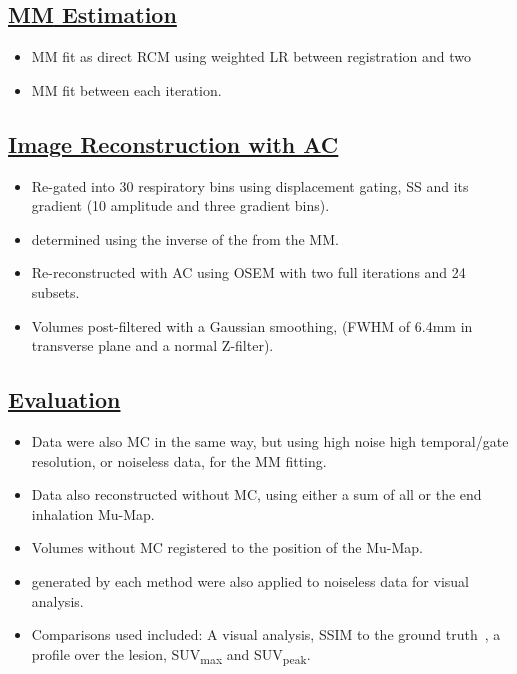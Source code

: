 \documentclass[portrait, color=UCLburgundy, margin=1cm]{uclposter}
\begin{document}
\begin{multicols}{3}
            \subsection*{\underline{\textbf{\acrlong{MM} Estimation}}}
                \begin{itemize}
                    \item \gls{MM} fit as direct \acrlong{RCM} using weighted \gls{LR} between registration  and two 
                    \item \gls{MM} fit between each iteration.
                \end{itemize}
            
            \subsection*{\underline{\textbf{Image Reconstruction with AC}}}
                \begin{itemize}
                    \item Re-gated into 30 respiratory bins using displacement gating, \gls{SS} and its gradient (10 amplitude and three gradient bins).
                    \item {} determined using the inverse of the  from the \gls{MM}.
                    \item Re-reconstructed with \gls{AC} using \gls{OSEM} with two full iterations and 24 subsets.
                    \item Volumes post-filtered with a Gaussian smoothing, (\gls{FWHM} of 6.4mm in transverse plane and a normal Z-filter).
                \end{itemize}
            
            \subsection*{\underline{\textbf{Evaluation}}}
                \begin{itemize}
                    \item Data were also \gls{MC} in the same way, but using high noise high temporal/gate resolution, or noiseless data, for the \gls{MM} fitting.
                    \item Data also reconstructed without \gls{MC}, using either a sum of all  or the end inhalation \gls{Mu-Map}.
                    \item Volumes without \gls{MC} registered to the position of the \gls{Mu-Map}.
                    \item {} generated by each method were also applied to noiseless data for visual analysis.
                    \item Comparisons used included: A visual analysis, \acrshort{SSIM} to the ground truth~\cite{Wang2009MeanMeasures}, a profile over the lesion, \gls{SUV}\textsubscript{max} and \gls{SUV}\textsubscript{peak}.
                \end{itemize}
        

\end{multicols}
\end{document}
